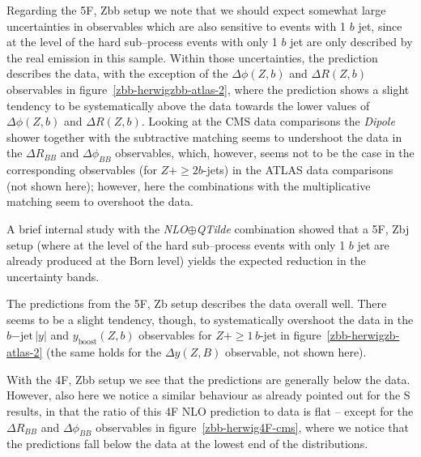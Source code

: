 \documentclass[11pt]{cernrep}
\newcommand{\Sherpa}{S\protect\scalebox{0.8}{HERPA}\xspace}
\newcommand{\Herwig}{H\protect\scalebox{0.8}{ERWIG}7\xspace}
\begin{document}

Regarding the 5F, Zbb setup we note that we should expect somewhat large
uncertainties in observables which are also sensitive to events with 1 $b$ jet,
since at the level of the hard sub--process events with only 1 $b$ jet are only
described by the real emission in this sample. Within those uncertainties, the
prediction describes the data, with the exception of the $\Delta \phi(Z,b)$ and
$\Delta R(Z,b)$ observables in figure~\ref{zbb-herwigzbb-atlas-2}, where the
prediction shows a slight tendency to be systematically above the data towards
the lower values of $\Delta \phi(Z,b)$ and $\Delta R(Z,b)$. Looking at the CMS
data comparisons the \textit{Dipole} shower together with the subtractive matching
seems to undershoot the data in the
$\Delta R_{BB}$ and $\Delta \phi_{BB}$ observables, which, however, seems not to
be the case in the corresponding observables (for $Z+\geq2b$-jets) in the ATLAS
data comparisons (not shown here); however, here the combinations with the
multiplicative matching seem to overshoot the data.

A brief internal study with the \textit{NLO}$\oplus$\textit{QTilde} combination
showed that a 5F, Zbj setup (where at the level of the hard sub--process events
with only 1 $b$ jet are already produced at the Born level) yields the expected
reduction in the uncertainty bands.

The predictions from the 5F, Zb setup describes the data overall well. There
seems to be a slight tendency, though, to systematically overshoot the data in
the $b\mathrm{-jet}\,|y|$ and $y_{\mathrm{boost}}(Z,b)$ observables for
$Z+\geq 1\,b$-jet in figure~\ref{zbb-herwigzb-atlas-2} (the same holds for the
$\Delta y(Z,B)$ observable, not shown here).

With the 4F, Zbb setup we see that the predictions are generally below the
data. However, also here we notice a similar behaviour as already pointed out
for the \Sherpa results, in that the ratio of this 4F NLO prediction to data is
flat -- except for the $\Delta R_{BB}$ and $\Delta \phi_{BB}$ observables in
figure~\ref{zbb-herwig4F-cms}, where we notice that the predictions fall below
the data at the lowest end of the distributions.
\end{document}
